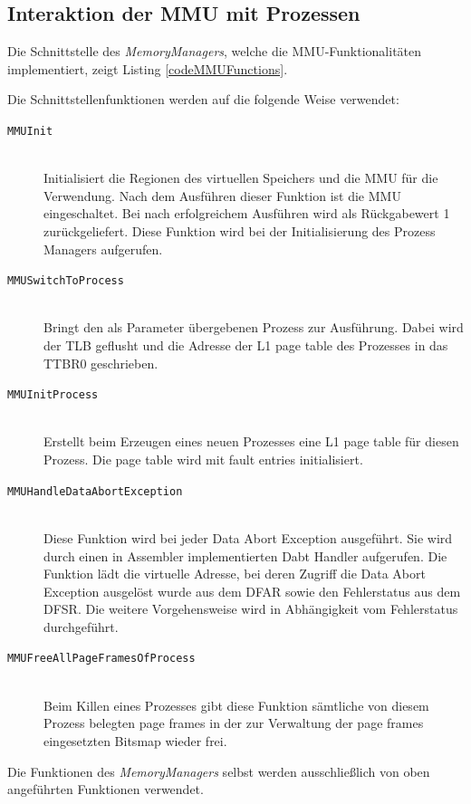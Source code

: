 \subsection{Interaktion der MMU mit Prozessen}

Die Schnittstelle des \textit{MemoryManagers}, welche die \ac{MMU}-Funktionalitäten implementiert, zeigt Listing \ref{codeMMUFunctions}.\\


\vspace{0.5cm}

Die Schnittstellenfunktionen werden auf die folgende Weise verwendet: 

\begin{description}
	\item[\texttt{MMUInit}] \hfill \\ Initialisiert die Regionen des virtuellen Speichers und die MMU für die Verwendung. Nach dem Ausführen dieser Funktion ist die MMU eingeschaltet. Bei nach erfolgreichem Ausführen wird als Rückgabewert 1 zurückgeliefert. Diese Funktion wird bei der Initialisierung des Prozess Managers aufgerufen.
	\item[\texttt{MMUSwitchToProcess}] \hfill \\ Bringt den als Parameter übergebenen Prozess zur Ausführung. Dabei wird der TLB geflusht und die Adresse der L1 page table des Prozesses in das TTBR0 geschrieben. 
	\item[\texttt{MMUInitProcess}] \hfill \\ Erstellt beim Erzeugen eines neuen Prozesses eine L1 page table für diesen Prozess. Die page table wird mit fault entries initialisiert.
	\item[\texttt{MMUHandleDataAbortException}] \hfill \\ Diese Funktion wird bei jeder Data Abort Exception ausgeführt. Sie wird durch einen in Assembler implementierten Dabt Handler aufgerufen. Die Funktion lädt die virtuelle Adresse, bei deren Zugriff die Data Abort Exception ausgelöst wurde aus dem \acf{DFAR} sowie den Fehlerstatus aus dem \acf{DFSR}. Die weitere Vorgehensweise wird in Abhängigkeit vom Fehlerstatus durchgeführt.
	\item[\texttt{MMUFreeAllPageFramesOfProcess}] \hfill \\ Beim Killen eines Prozesses gibt diese Funktion sämtliche von diesem Prozess belegten page frames in der zur Verwaltung der page frames eingesetzten Bitsmap wieder frei.
\end{description}

Die Funktionen des \textit{MemoryManagers} selbst werden ausschließlich von oben angeführten Funktionen verwendet.

\pagebreak 